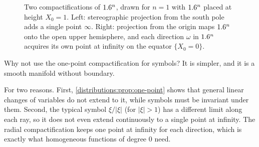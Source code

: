 \begin{figure}[htbp]
\centering
{}
\caption{Two compactifications of $1.6^n$, drawn for $n=1$ with $1.6^n$ placed at height
$X_0=1$. Left: stereographic projection from the south pole adds a single point
$\infty$. Right: projection from the origin maps $1.6^n$ onto the open upper hemisphere,
and each direction $\omega$ in $1.6^n$ acquires its own point at infinity on the
equator $\{X_0=0\}$.}
\label{distributions:fig:compactifications}
\end{figure}

\begin{question}
Why not use the one-point compactification for symbols? It is simpler, and it is a
smooth manifold without boundary.
\end{question}
\begin{answer}
For two reasons. First, \cref{distributions:prop:one-point} shows that general linear
changes of variables do not extend to it, while symbols must be invariant under them.
Second, the typical symbol $\xi/|\xi|$ (for $|\xi|>1$) has a different limit along each
ray, so it does not even extend continuously to a single point at infinity. The radial
compactification keeps one point at infinity for each direction, which is exactly what
homogeneous functions of degree $0$ need.
\end{answer}

